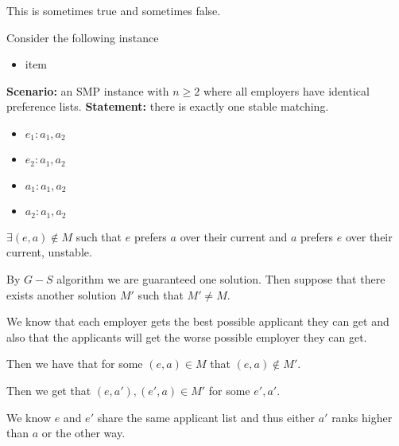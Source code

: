 \begin{questions}
	\begin{soln}
		This is sometimes true and sometimes false.

		Consider the following instance
		\begin{itemize}
			\item item
		\end{itemize}


	\end{soln}
	\ifsolutions\fi

	\question[4] \textbf{Scenario:} an SMP instance with $n \ge 2$ where all employers have identical preference lists. \textbf{Statement:} there is exactly one stable matching.
	\begin{itemize}
		\item	\(e_1 : a_1, a_2\)
		\item \(e_2 : a_1, a_2\)
		\item \(a_1 : a_1, a_2\)
		\item \(a_2 : a_1, a_2\)
	\end{itemize}

	\ifsolutions\fi

	\(\exists (e, a) \notin M\) such that \(e\) prefers \(a\) over their current and \(a\) prefers \(e\) over their current, unstable.

	\begin{soln}

		By \(G-S\) algorithm we are guaranteed one solution. Then suppose that there exists another solution \(M'\) such that \(M' \neq M\).

		We know that each employer gets the best possible applicant they can get and also that the applicants will get the worse possible employer they can get.

		Then we have that for some \((e, a) \in M\) that \((e, a) \notin M'\).

		Then we get that \((e, a'), (e', a) \in M'\) for some \(e', a'\).

		We know \(e\) and \(e'\) share the same applicant list and thus either \(a'\) ranks higher than \(a\) or the other way.


	\end{soln}

\end{questions}
